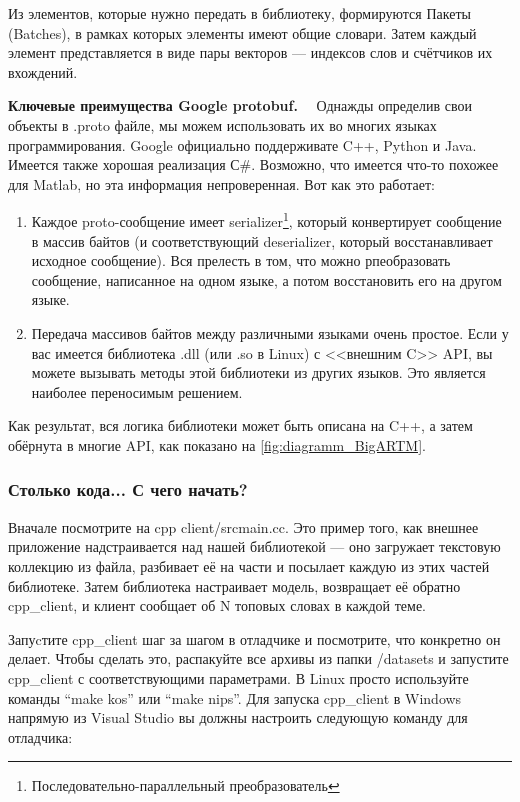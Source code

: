 \documentclass[12pt]{article}
\begin{document}
Из элементов, которые нужно передать в библиотеку, формируются Пакеты (Batches), в рамках которых элементы имеют общие словари. Затем каждый элемент представляется в виде пары векторов --- индексов слов и счётчиков их вхождений.

{\bf Ключевые преимущества Google protobuf.}$\quad$ Однажды определив свои объекты в .proto файле, мы можем использовать их во многих языках программирования. Google официально поддерживате C++, Python и Java. Имеется также хорошая реализация С\#. Возможно, что имеется что-то похожее для Matlab, но эта информация непроверенная. Вот как это работает:
\begin{enumerate}
	\item Каждое proto-сообщение имеет serializer\footnote{Последовательно-параллельный преобразователь}, который конвертирует сообщение в массив байтов (и соответствующий deserializer, который восстанавливает исходное сообщение). Вся прелесть в том, что можно рпеобразовать сообщение, написанное на одном языке, а потом восстановить его на другом языке.
	\item Передача массивов байтов между различными языками очень простое. Если у вас имеется библиотека .dll (или .so в Linux) с <<внешним C>> API, вы можете вызывать методы этой библиотеки из других языков. Это является наиболее переносимым решением.
\end{enumerate}

Как результат, вся логика библиотеки может быть описана на C++, а затем обёрнута в многие API, как показано на \ref{fig:diagramm_BigARTM}.

\subsubsection{Столько кода... С чего начать?}
Вначале посмотрите на cpp client/srcmain.cc. Это пример того, как внешнее приложение надстраивается над нашей библиотекой --- оно загружает текстовую коллекцию из файла, разбивает её на части и посылает каждую из этих частей библиотеке. Затем библиотека настраивает модель, возвращает её обратно cpp\_client, и клиент сообщает об N топовых словах в каждой теме. 

Запуcтите cpp\_client шаг за шагом в отладчике и посмотрите, что конкретно он делает.
Чтобы сделать это, распакуйте все архивы из папки /datasets и запустите cpp\_client с соответствующими параметрами. В Linux просто используйте команды ``make kos'' или ``make nips''. Для запуска cpp\_client в Windows напрямую из Visual Studio вы должны настроить  следующую команду для отладчика:
\end{document}
